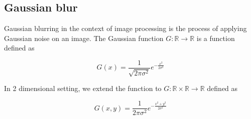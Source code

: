 \documentclass[pdftex,12pt,a4paper]{report}
\begin{document}


\subsection{Gaussian blur}
\label{subsection:gaussian_blur}

Gaussian blurring in the context of image processing is the process of applying Gaussian noise on an image. The Gaussian function $G: \mathbb{R} \rightarrow \mathbb{R}$ is a function defined as

$$
G(x) = \frac{1}{\sqrt{2\pi \sigma^2}} e^{-\frac{x^2}{2 \sigma^2}}
$$

In 2 dimensional setting, we extend the function to $G: \mathbb{R} \times \mathbb{R} \rightarrow \mathbb{R}$ defined as

\begin{equation}
G(x,y) = \frac{1}{{2\pi \sigma^2}} e^{-\frac{x^2 + y^2}{2 \sigma^2}}
\label{equation:gauss_2d}
\end{equation}
\end{document}
